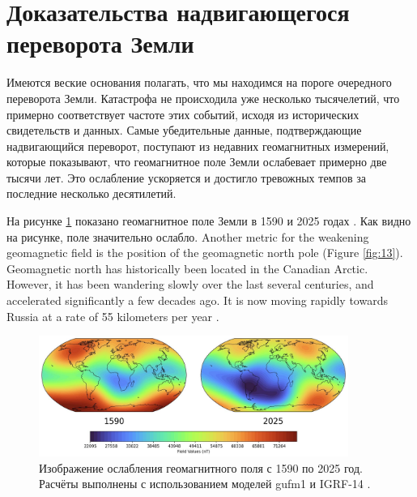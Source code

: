 \documentclass[10pt,twocolumn,letterpaper]{article}
\begin{document}
\section{Доказательства надвигающегося переворота Земли}

Имеются веские основания полагать, что мы находимся на пороге очередного переворота Земли. Катастрофа не происходила уже несколько тысячелетий, что примерно соответствует частоте этих событий, исходя из исторических свидетельств и данных. Самые убедительные данные, подтверждающие надвигающийся переворот, поступают из недавних геомагнитных измерений, которые показывают, что геомагнитное поле Земли ослабевает примерно две тысячи лет. Это ослабление ускоряется и достигло тревожных темпов за последние несколько десятилетий.

На рисунке \ref{fig:14} показано геомагнитное поле Земли в 1590 и 2025 годах \cite{125,126}. Как видно на рисунке, поле значительно ослабло.
Another metric for the weakening geomagnetic field is the position of the geomagnetic north pole (Figure \ref{fig:13}). Geomagnetic north has historically been located in the Canadian Arctic. However, it has been wandering slowly over the last several centuries, and accelerated significantly a few decades ago. It is now moving rapidly towards Russia at a rate of 55 kilometers per year \cite{124}.

\begin{figure}[t]
\begin{center}
\includegraphics[width=0.9\textwidth]{saa.jpg}
\end{center}
   \caption{Изображение ослабления геомагнитного поля с 1590 по 2025 год. Расчёты выполнены с использованием моделей gufm1 и IGRF-14 \cite{125,126}.}
\label{fig:14}
\end{figure}
\end{document}
